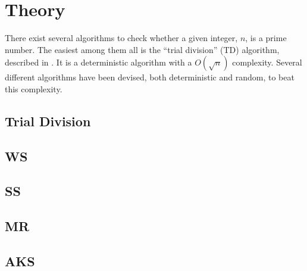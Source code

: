 
\section{Theory}
There exist several algorithms to check whether a given integer, $n$, is a prime number.
The easiest among them all is the ``trial division'' (TD) algorithm, described in .
It is a deterministic algorithm with a $O(\sqrt{n})$ complexity.
Several different algorithms have been devised, both deterministic and random, to beat this complexity.

\subsection{Trial Division} \label{sec:TD_theory}


\subsection{WS} \label{sec:WS_theory}


\subsection{SS} \label{sec:SS_theory}


\subsection{MR} \label{sec:MR_theory}


\subsection{AKS} \label{sec:AKS_theory}



